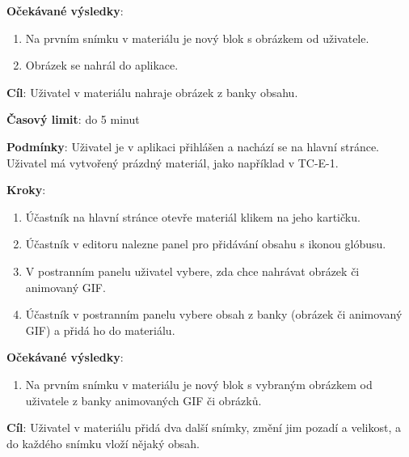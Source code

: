 \textbf{Očekávané výsledky}:

\begin{enumerate}[leftmargin=1.4cm]
    \item Na prvním snímku v materiálu je nový blok s obrázkem od uživatele.
    \item Obrázek se nahrál do aplikace.
\end{enumerate}






\vspace{1em}

\textbf{Cíl}: Uživatel v materiálu nahraje obrázek z banky obsahu.

\textbf{Časový limit}: do 5 minut

\textbf{Podmínky}:  Uživatel je v aplikaci přihlášen a nachází se na hlavní stránce. Uživatel má vytvořený prázdný materiál, jako například v TC-E-1.

\textbf{Kroky}:

\begin{enumerate}[leftmargin=1.4cm]
    \item Účastník na hlavní stránce otevře materiál klikem na jeho kartičku.
    \item Účastník v editoru nalezne panel pro přidávání obsahu s ikonou glóbusu.
    \item V postranním panelu uživatel vybere, zda chce nahrávat obrázek či animovaný GIF.
    \item Účastník v postranním panelu vybere obsah z banky (obrázek či animovaný GIF) a přidá ho do materiálu.
\end{enumerate}

\textbf{Očekávané výsledky}:

\begin{enumerate}[leftmargin=1.4cm]
    \item Na prvním snímku v materiálu je nový blok s vybraným obrázkem od uživatele z banky animovaných GIF či obrázků.
\end{enumerate}






\vspace{1em}

\textbf{Cíl}: Uživatel v materiálu přidá dva další snímky, změní jim pozadí a velikost, a do každého snímku vloží nějaký obsah.

